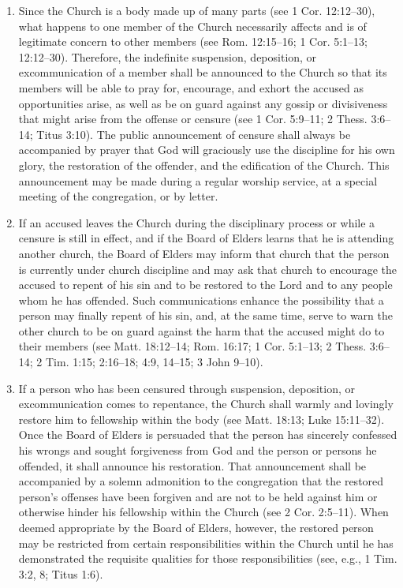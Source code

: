 \documentclass[
]{book}
\begin{document}
\begin{enumerate}
\def\labelenumi{\arabic{enumi}.}
\setcounter{enumi}{25}
\item
  Since the Church is a body made up of many parts (see 1 Cor. 12:12--30), what happens to one member of the Church necessarily affects and is of legitimate concern to other members (see Rom. 12:15--16; 1 Cor. 5:1--13; 12:12--30). Therefore, the indefinite suspension, deposition, or excommunication of a member shall be announced to the Church so that its members will be able to pray for, encourage, and exhort the accused as opportunities arise, as well as be on guard against any gossip or divisiveness that might arise from the offense or censure (see 1 Cor. 5:9--11; 2 Thess. 3:6--14; Titus 3:10). The public announcement of censure shall always be accompanied by prayer that God will graciously use the discipline for his own glory, the restoration of the offender, and the edification of the Church. This announcement may be made during a regular worship service, at a special meeting of the congregation, or by letter.
\item
  If an accused leaves the Church during the disciplinary process or while a censure is still in effect, and if the Board of Elders learns that he is attending another church, the Board of Elders may inform that church that the person is currently under church discipline and may ask that church to encourage the accused to repent of his sin and to be restored to the Lord and to any people whom he has offended. Such communications enhance the possibility that a person may finally repent of his sin, and, at the same time, serve to warn the other church to be on guard against the harm that the accused might do to their members (see Matt. 18:12--14; Rom. 16:17; 1 Cor. 5:1--13; 2 Thess. 3:6--14; 2 Tim. 1:15; 2:16--18; 4:9, 14--15; 3 John 9--10).
\item
  If a person who has been censured through suspension, deposition, or excommunication comes to repentance, the Church shall warmly and lovingly restore him to fellowship within the body (see Matt. 18:13; Luke 15:11--32). Once the Board of Elders is persuaded that the person has sincerely confessed his wrongs and sought forgiveness from God and the person or persons he offended, it shall announce his restoration. That announcement shall be accompanied by a solemn admonition to the congregation that the restored person's offenses have been forgiven and are not to be held against him or otherwise hinder his fellowship within the Church (see 2 Cor. 2:5--11). When deemed appropriate by the Board of Elders, however, the restored person may be restricted from certain responsibilities within the Church until he has demonstrated the requisite qualities for those responsibilities (see, e.g., 1 Tim. 3:2, 8; Titus 1:6).
\end{enumerate}
\end{document}
